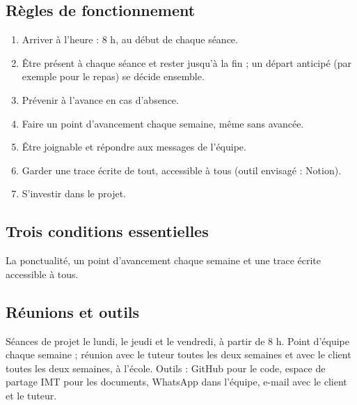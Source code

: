 \label{sec:contrat-equipe}

\subsection*{Règles de fonctionnement}
\begin{enumerate}
  \item Arriver à l'heure : 8 h, au début de chaque séance.
  \item Être présent à chaque séance et rester jusqu'à la fin ; un départ anticipé (par exemple pour le repas) se décide ensemble.
  \item Prévenir à l'avance en cas d'absence.
  \item Faire un point d'avancement chaque semaine, même sans avancée.
  \item Être joignable et répondre aux messages de l'équipe.
  \item Garder une trace écrite de tout, accessible à tous (outil envisagé : Notion).
  \item S'investir dans le projet.
\end{enumerate}


\subsection*{Trois conditions essentielles}
La ponctualité, un point d'avancement chaque semaine et une trace écrite accessible à tous.

\subsection*{Réunions et outils}
Séances de projet le lundi, le jeudi et le vendredi, à partir de 8 h. Point d'équipe chaque semaine ; réunion avec le tuteur toutes les deux semaines et avec le client toutes les deux semaines, à l'école. Outils : GitHub pour le code, espace de partage IMT pour les documents, WhatsApp dans l'équipe, e-mail avec le client et le tuteur.
